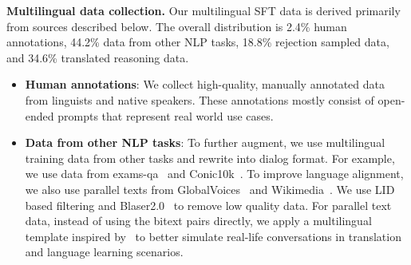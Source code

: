 \textbf{Multilingual data collection.} Our multilingual SFT data is derived primarily from sources described below. The overall distribution is 2.4\% human annotations, 44.2\% data from other NLP tasks, 18.8\% rejection sampled data, and 34.6\% translated reasoning data.

\begin{itemize}
        \item \textbf{Human annotations}: We collect high-quality, manually annotated data from linguists and native speakers. These annotations mostly consist of open-ended prompts that represent real world use cases. 

        \item \textbf{Data from other NLP tasks}: To further augment, we use multilingual training data from other tasks and rewrite into dialog format. For example, we use data from exams-qa~\citep{hardalov-etal-2020-exams} and Conic10k~\citep{wu2023conic10kchallengingmathproblem}. To improve language alignment, we also use parallel texts from GlobalVoices~\citep{PROKOPIDIS16.778} and Wikimedia~\citep{Tiedemann2012ParallelDT}. We use LID based filtering and Blaser2.0~\citep{seamlessm4t2023} to remove low quality data. For parallel text data, instead of using the bitext pairs directly, we apply a multilingual template inspired by~\citet{weifinetuned} to better simulate real-life conversations in translation and language learning scenarios.


\end{itemize}
